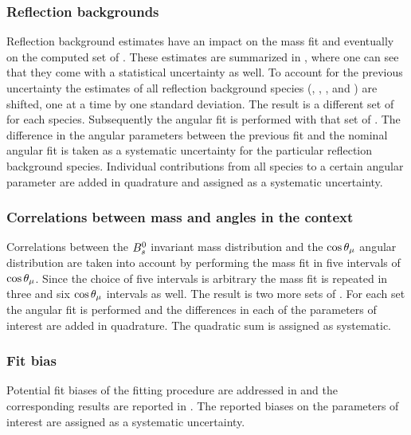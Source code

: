 \subsubsection{Reflection backgrounds}
\label{systPeakBkg}
Reflection background estimates have an impact on the mass fit and eventually on the computed set of \sWeights.
These estimates are summarized in , where one can see that they come with a statistical uncertainty as well.
To account for the previous uncertainty  the estimates of all reflection background species (\BsJpsiKK, \BsJpsipipi, \BdJpsipipi, and \LbJpsipK)
are shifted, one at a time by one standard deviation. The result is a different set of \sWeights for each species.
Subsequently the angular fit is performed with that set of \sWeights. The difference in the angular parameters
between the previous fit and the nominal angular fit is taken as a systematic uncertainty for the particular reflection
background species. Individual contributions from all species to a certain angular parameter are added in quadrature
and assigned as a systematic uncertainty.

\subsubsection{Correlations between mass and angles in the \sPlot context}
\label{systCorrs}
Correlations between the $B^0_s$ invariant mass distribution and the $\cos\theta_{\mu}$ angular distribution are taken into account
by performing the mass fit in five intervals of $\cos\theta_{\mu}$. Since the choice of five intervals is arbitrary the mass fit is
repeated in three and six $\cos\theta_{\mu}$ intervals as well. The result is two more sets of \sWeights. For each set the angular
fit is performed and the differences in each of the parameters of interest are added in quadrature.
The quadratic sum is assigned as systematic.

\subsubsection{Fit bias}
\label{systFitBias}
Potential fit biases of the fitting procedure are addressed in  and the corresponding
results are reported in . The reported biases on the parameters of interest are assigned as a systematic uncertainty.

